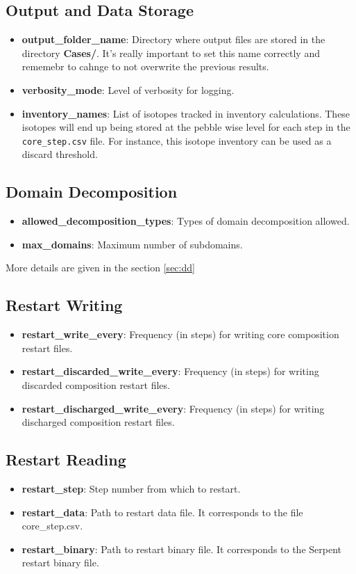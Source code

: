 \documentclass{article}
\begin{document}
\subsection{Output and Data Storage}
\begin{itemize}
    \item \textbf{output\_folder\_name}: Directory where output files are stored in the directory \textbf{Cases/}. It's really important to set this name correctly and rememebr to cahnge to not overwrite the previous results.
    \item \textbf{verbosity\_mode}: Level of verbosity for logging.
    \item \textbf{inventory\_names}: List of isotopes tracked in inventory calculations. These isotopes will end up being stored at the pebble wise level for each step in the \texttt{core\_{step}.csv} file. For instance, this isotope inventory can be used as a discard threshold.
\end{itemize}

\subsection{Domain Decomposition}
\begin{itemize}
    \item \textbf{allowed\_decomposition\_types}: Types of domain decomposition allowed.
    \item \textbf{max\_domains}: Maximum number of subdomains.
\end{itemize}

More details are given in the section \ref{sec:dd}

\subsection{Restart Writing}
\begin{itemize}
    \item \textbf{restart\_write\_every}: Frequency (in steps) for writing core composition restart files.
    \item \textbf{restart\_discarded\_write\_every}: Frequency (in steps) for writing discarded composition restart files.
    \item \textbf{restart\_discharged\_write\_every}: Frequency (in steps) for writing discharged composition restart files.
\end{itemize}

\subsection{Restart Reading}
\begin{itemize}
    \item \textbf{restart\_step}: Step number from which to restart.
    \item \textbf{restart\_data}: Path to restart data file. It corresponds to the file {core\_{step}.csv}.
    \item \textbf{restart\_binary}: Path to restart binary file. It corresponds to the Serpent restart binary file.
\end{itemize}
\end{document}
